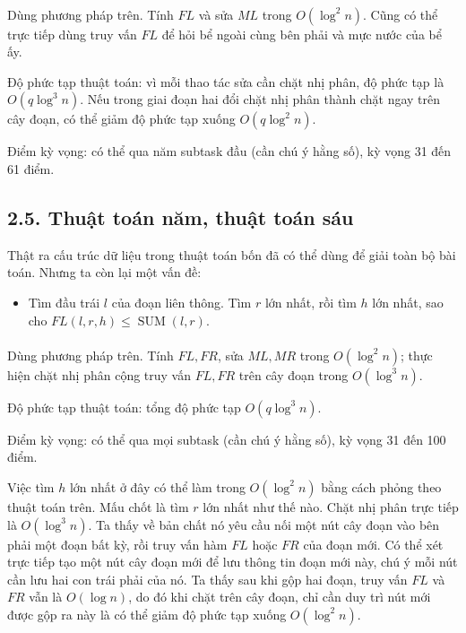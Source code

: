 \documentclass[11pt]{article}
\DeclareMathOperator{\SUM}{SUM}
\begin{document}
\paragraph{}
Dùng phương pháp trên. Tính \(FL\) và sửa \(ML\) trong \(O(\log^2 n)\). Cũng
có thể trực tiếp dùng truy vấn \(FL\) để hỏi bể ngoài cùng bên phải và mực
nước của bể ấy.

Độ phức tạp thuật toán: vì mỗi thao tác sửa cần chặt nhị phân, độ phức tạp là
\(O(q\log^3 n)\). Nếu trong giai đoạn hai đổi chặt nhị phân thành chặt ngay
trên cây đoạn, có thể giảm độ phức tạp xuống \(O(q\log^2 n)\).

Điểm kỳ vọng: có thể qua năm subtask đầu (cần chú ý hằng số), kỳ vọng 31 đến
61 điểm.

\subsection*{2.5. Thuật toán năm, thuật toán sáu}

Thật ra cấu trúc dữ liệu trong thuật toán bốn đã có thể dùng để giải toàn bộ
bài toán. Nhưng ta còn lại một vấn đề:

\begin{itemize}
  \item Tìm đầu trái \(l\) của đoạn liên thông. Tìm \(r\) lớn nhất, rồi tìm
        \(h\) lớn nhất, sao cho \(FL(l,r,h)\le \SUM(l,r)\).
\end{itemize}

\paragraph{}
Dùng phương pháp trên. Tính \(FL,FR\), sửa \(ML,MR\) trong \(O(\log^2 n)\);
thực hiện chặt nhị phân cộng truy vấn \(FL,FR\) trên cây đoạn trong
\(O(\log^3 n)\).

Độ phức tạp thuật toán: tổng độ phức tạp \(O(q\log^3 n)\).

Điểm kỳ vọng: có thể qua mọi subtask (cần chú ý hằng số), kỳ vọng 31 đến 100
điểm.

Việc tìm \(h\) lớn nhất ở đây có thể làm trong \(O(\log^2 n)\) bằng cách
phỏng theo thuật toán trên. Mấu chốt là tìm \(r\) lớn nhất như thế nào. Chặt
nhị phân trực tiếp là \(O(\log^3 n)\). Ta thấy về bản chất nó yêu cầu nối một
nút cây đoạn vào bên phải một đoạn bất kỳ, rồi truy vấn hàm \(FL\) hoặc \(FR\)
của đoạn mới. Có thể xét trực tiếp tạo một nút cây đoạn mới để lưu thông tin
đoạn mới này, chú ý mỗi nút cần lưu hai con trái phải của nó. Ta thấy sau khi
gộp hai đoạn, truy vấn \(FL\) và \(FR\) vẫn là \(O(\log n)\), do đó khi chặt
trên cây đoạn, chỉ cần duy trì nút mới được gộp ra này là có thể giảm độ phức
tạp xuống \(O(\log^2 n)\).
\end{document}
